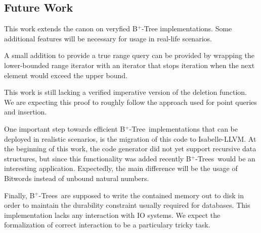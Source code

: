 \documentclass[a4paper,UKenglish,cleveref, autoref, thm-restate]{lipics-v2021}
\newcommand{\btree}{B$^+$-Tree}
\newcommand{\btrees}{B$^+$-Trees}
\begin{document}
\subsection{Future Work}

This work extends the canon on veryfied \btree
implementations.
Some additional features will be necessary for
usage in real-life scenarios.

A small addition to provide a true
range query can be provided by wrapping the lower-bounded
range iterator with an iterator
that stops iteration when the next element
would exceed the upper bound.

This work is still lacking a verified imperative version
of the deletion function.
We are expecting this proof to roughly follow
the approach used for point queries and insertion.

One important step towards efficient
\btree\ implementations that can be deployed
in realistic scenarios, is the migration of this code
to Isabelle-LLVM. \cite{DBLP:conf/itp/Lammich19}
At the beginning of this work, the code generator did
not yet support recursive data structures, but since
this functionality was added recently \btrees\ would be an interesting application.
Expectedly, the main difference will be the usage of Bitwords
instead of unbound natural numbers.

Finally, \btrees\ are supposed to write the contained
memory out to disk in order to maintain the durability constraint
usually required for databases.
This implementation lacks any interaction with IO systems.
We expect the formalization of correct interaction 
to be a particulary tricky task.



\end{document}
